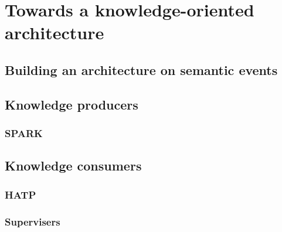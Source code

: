\chapter{Towards a knowledge-oriented architecture}
\label{chapter|architecture}

\section{Building an architecture on semantic events}
\label{sect|events}

\section{Knowledge producers}
\label{sect|producers}

\subsection{SPARK}
\label{subssect|spark}

\section{Knowledge consumers}
\label{sect|consumers}

\subsection{HATP}
\label{subssect|hatp}

\subsection{Supervisers}
\label{subssect|supervision}
